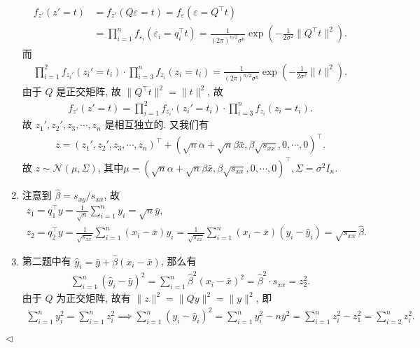 \documentclass[11pt]{article}
\newenvironment{answer}[1][Solution]{\begin{trivlist}
    \item[\hskip \labelsep {\bfseries #1.}\hskip \labelsep]}{\hfill$\lhd$\end{trivlist}}
\newcommand\1{\mathds{1}}
\newcommand\NN{\mathcal{N}}
\begin{document}
\begin{answer}
\begin{enumerate}[label = (\arabic*)]
        \begin{align*}
            f_{z'}(z' = t) &= f_{z'}(Q\varepsilon = t) = f_{\varepsilon}(\varepsilon = Q^{\top}t) \\
            &= \prod_{i=1}^{n} f_{\varepsilon_i}(\varepsilon_i = q_i^{\top}t) = \frac{1}{(2\pi)^{n/2}\sigma^n} \exp\left(-\frac{1}{2\sigma^2}\|Q^{\top}t\|^2\right).
        \end{align*}
        而
        \begin{align*}
            \prod_{i=1}^{2} f_{z_i'}(z_i' = t_i) \cdot \prod_{i=3}^{n} f_{z_i}(z_i = t_i) = \frac{1}{(2\pi)^{n/2}\sigma^n} \exp\left(-\frac{1}{2\sigma^2}\|t\|^2\right).
        \end{align*}
        由于 $Q$ 是正交矩阵, 故 $\|Q^{\top}t\|^2 = \|t\|^2$, 故
        \begin{align*}
            f_{z'}(z' = t) = \prod_{i=1}^{2} f_{z_i'}(z_i' = t_i) \cdot \prod_{i=3}^{n} f_{z_i}(z_i = t_i).
        \end{align*}
        故 $z_1', z_2', z_3, \cdots, z_n$ 是相互独立的. 又我们有
        \begin{align*}
            z = (z_1', z_2', z_3, \cdots, z_n)^{\top} + (\sqrt{n}\alpha+\sqrt{n}\beta\bar{x}, \beta\sqrt{s_{xx}}, 0, \cdots, 0)^{\top}.
        \end{align*}
        故 $z \sim \NN\left(\mu, \Sigma\right)$, 其中$\mu = (\sqrt{n}\alpha+\sqrt{n}\beta\bar{x}, \beta\sqrt{s_{xx}}, 0, \cdots, 0)^{\top}, \Sigma = \sigma^2 I_n$. 
        \item 注意到 $\hat{\beta} = s_{xy}/s_{xx}$, 故
        \begin{gather*}
            z_1 = q_1^{\top} y = \frac{1}{\sqrt{n}}\sum_{i=1}^{n} y_i = \sqrt{n}\bar{y}, \\
            z_2 = q_2^{\top} y = \frac{1}{\sqrt{s_{xx}}}\sum_{i=1}^{n} (x_i - \bar{x})y_i = \frac{1}{\sqrt{s_{xx}}} \sum_{i=1}^{n} (x_i - \bar{x})(y_i - \hat{y}_i) = \sqrt{s_{xx}}\hat{\beta}.
        \end{gather*}
        \item 第二题中有 $\hat{y}_i = \bar{y} + \hat{\beta}(x_i - \bar{x})$, 那么有
        \begin{align*}
            \sum_{i=1}^{n} (\hat{y}_i - \bar{y})^2 = \sum_{i=1}^{n} \hat{\beta}^2(x_i - \bar{x})^2 = \hat{\beta}^2 \cdot s_{xx} = z_2^2.
        \end{align*}
        由于 $Q$ 为正交矩阵, 故有 $\|z\|^2 = \|Qy\|^2 = \|y\|^2$, 即
        \begin{align*}
            \sum_{i=1}^{n} y_i^2 = \sum_{i=1}^{n} z_i^2 \implies \sum_{i=1}^{n} (y_i - \hat{y}_i)^2 = \sum_{i=1}^{n} y_i^2 - n\bar{y}^2 = \sum_{i=1}^{n}z_i^2 - z_1^2 = \sum_{i=2}^{n} z_i^2.

\end{align*}
\end{enumerate}
\end{answer}
\end{document}
